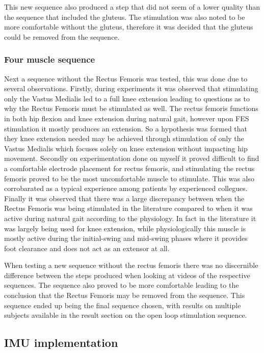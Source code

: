 This new sequence also produced a step that did not seem of a lower quality than the sequence that included the gluteus. The stimulation was also noted to be more comfortable without the gluteus, therefore it was decided that the gluteus could be removed from the sequence.



\subsubsection{Four muscle sequence}
Next a sequence without the Rectus Femoris was tested, this was done due to several observations. Firstly, during experiments it was observed that stimulating only the Vastus Medialis led to a full knee extension leading to questions as to why the Rectus Femoris must be stimulated as well. The rectus femoris functions in both hip flexion and knee extension during natural gait, however upon FES stimulation it mostly produces an extension. So a hypothesis was formed that they knee extension needed may be achieved through stimulation of only the Vastus Medialis which focuses solely on knee extension without impacting hip movement. Secondly on experimentation done on myself it proved difficult to find a comfortable electrode placement for rectus femoris, and stimulating the rectus femoris proved to be the most uncomfortable muscle to stimulate. This was also corrobarated as a typical experience among patients by experienced collegues. 
Finally it was observed that there was a large discrepancy between when the Rectus Femoris was being stimulated in the literature compared to when it was active during natural gait according to the physiology. In fact in the literature it was largely being used for knee extension, while physiologically this muscle is mostly active during the initial-swing and mid-swing phases where it provides foot clearance and does not act as an extensor at all. 

When testing a new sequence without the rectus femoris there was no discernible difference between the steps produced when looking at videos of the respective sequences. The sequence also proved to be more comfortable leading to the conclusion that the Rectus Femoris may be removed from the sequence. This sequence ended up being the final sequence chosen, with results on multiple subjects available in the result section on the open loop stimulation sequence.


\subsection{IMU implementation}































